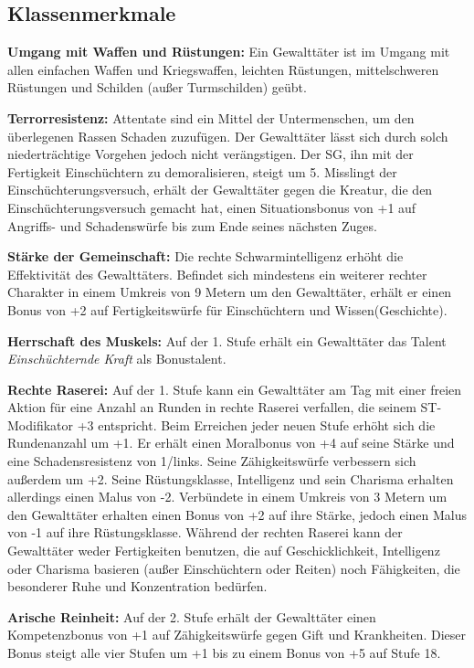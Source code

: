 \documentclass[
	ngerman,
	a4paper,
	11pt,
	twocolumn,
]{scrartcl}
\begin{document}
\subsection*{Klassenmerkmale}

\textbf{Umgang mit Waffen und Rüstungen:} Ein Gewalttäter ist im Umgang mit allen einfachen Waffen und Kriegswaffen, leichten Rüstungen, mittelschweren Rüstungen und Schilden (außer Turmschilden) geübt.

\textbf{Terrorresistenz:} Attentate sind ein Mittel der Untermenschen, um den überlegenen Rassen Schaden zuzufügen. Der Gewalttäter lässt sich durch solch niederträchtige Vorgehen jedoch nicht verängstigen. Der SG, ihn mit der Fertigkeit Einschüchtern zu demoralisieren, steigt um 5. Misslingt der Einschüchterungsversuch, erhält der Gewalttäter gegen die Kreatur, die den Einschüchterungsversuch gemacht hat, einen Situationsbonus von +1 auf Angriffs- und Schadenswürfe bis zum Ende seines nächsten Zuges.

\textbf{Stärke der Gemeinschaft:} Die rechte Schwarmintelligenz erhöht die Effektivität des Gewalttäters. Befindet sich mindestens ein weiterer rechter Charakter in einem Umkreis von 9 Metern um den Gewalttäter, erhält er einen Bonus von +2 auf Fertigkeitswürfe für Einschüchtern und Wissen(Geschichte).

\textbf{Herrschaft des Muskels:} Auf der 1. Stufe erhält ein Gewalttäter das Talent \textit{Einschüchternde Kraft} als Bonustalent.

\textbf{Rechte Raserei:} Auf der 1. Stufe kann ein Gewalttäter am Tag mit einer freien Aktion für eine Anzahl an Runden in rechte Raserei verfallen, die seinem ST-Modifikator +3 entspricht. Beim Erreichen jeder neuen Stufe erhöht sich die Rundenanzahl um +1. Er erhält einen Moralbonus von +4 auf seine Stärke und eine Schadensresistenz von 1/links. Seine Zähigkeitswürfe verbessern sich außerdem um +2. Seine Rüstungsklasse, Intelligenz und sein Charisma erhalten allerdings einen Malus von -2. Verbündete in einem Umkreis von 3 Metern um den Gewalttäter erhalten einen Bonus von +2 auf ihre Stärke, jedoch einen Malus von -1 auf ihre Rüstungsklasse. Während der rechten Raserei kann der Gewalttäter weder Fertigkeiten benutzen, die auf Geschicklichkeit, Intelligenz oder Charisma basieren (außer Einschüchtern oder Reiten) noch Fähigkeiten, die besonderer Ruhe und Konzentration bedürfen.

\textbf{Arische Reinheit:} Auf der 2. Stufe erhält der Gewalttäter einen Kompetenzbonus von +1 auf Zähigkeitswürfe gegen Gift und Krankheiten. Dieser Bonus steigt alle vier Stufen um +1 bis zu einem Bonus von +5 auf Stufe 18.
\end{document}
